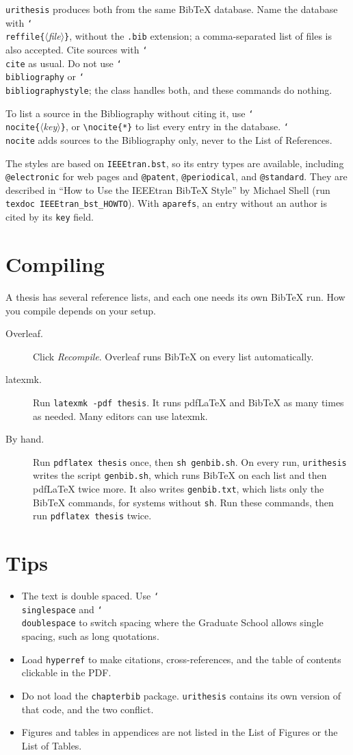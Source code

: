 \documentclass[11pt]{article}
\newcommand\cls{\texttt{urithesis}}
\newcommand\cs[1]{\texttt{\char`\\#1}}
\newcommand\meta[1]{\textit{$\langle$#1$\rangle$}}
\newcommand\marg[1]{\texttt{\{}\meta{#1}\texttt{\}}}
\newcommand\opt[1]{\texttt{#1}}
\newcommand\file[1]{\texttt{#1}}
\begin{document}
\noindent \cls{} produces both from the same Bib\TeX{} database.
Name the database with \cs{reffile}\marg{file}, without the \file{.bib}
extension; a comma-separated list of files is also accepted.
Cite sources with \cs{cite} as usual.
Do not use \cs{bibliography} or \cs{bibliographystyle}; the class handles
both, and these commands do nothing.

To list a source in the Bibliography without citing it, use
\cs{nocite}\marg{key}, or \verb|\nocite{*}| to list every entry in the
database.
\cs{nocite} adds sources to the Bibliography only, never to the List of
References.

The styles are based on \texttt{IEEEtran.bst}, so its entry types are
available, including \texttt{@electronic} for web pages and \texttt{@patent},
\texttt{@periodical}, and \texttt{@standard}.
They are described in ``How to Use the IEEEtran Bib\TeX{} Style'' by Michael
Shell (run \verb|texdoc IEEEtran_bst_HOWTO|).
With \opt{aparefs}, an entry without an author is cited by its \texttt{key}
field.

\section{Compiling}\label{sec:compile}

A thesis has several reference lists, and each one needs its own Bib\TeX{}
run.
How you compile depends on your setup.
\begin{description}
\item[Overleaf.] Click \emph{Recompile}. Overleaf runs Bib\TeX{} on every list
  automatically.
\item[latexmk.] Run \verb|latexmk -pdf thesis|. It runs pdf\LaTeX{} and
  Bib\TeX{} as many times as needed. Many editors can use latexmk.
\item[By hand.] Run \verb|pdflatex thesis| once, then \verb|sh genbib.sh|.
  On every run, \cls{} writes the script \file{genbib.sh}, which runs Bib\TeX{}
  on each list and then pdf\LaTeX{} twice more. It also writes
  \file{genbib.txt}, which lists only the Bib\TeX{} commands, for systems
  without \texttt{sh}. Run these commands, then run \verb|pdflatex thesis|
  twice.
\end{description}

\section{Tips}

\begin{itemize}
\item The text is double spaced. Use \cs{singlespace} and \cs{doublespace} to
  switch spacing where the Graduate School allows single spacing, such as long
  quotations.
\item Load \texttt{hyperref} to make citations, cross-references, and the
  table of contents clickable in the PDF.
\item Do not load the \texttt{chapterbib} package. \cls{} contains its own
  version of that code, and the two conflict.
\item Figures and tables in appendices are not listed in the List of Figures
  or the List of Tables.
\end{itemize}
\end{document}
